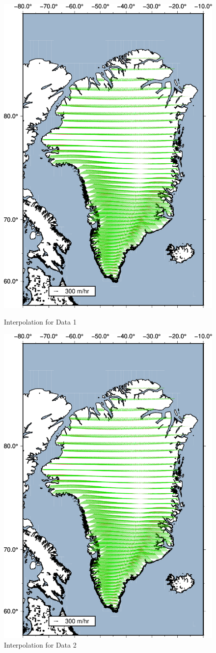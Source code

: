 \documentclass{article}
\begin{document}
\begin{figure}[!htb]
   \begin{minipage}{0.48\textwidth}
     \centering
     \includegraphics[width=.7\linewidth]{Ridge_pred_REAL.pdf}
     \caption{Interpolation for Data 1}\label{Fig:Data1}
   \end{minipage}\hfill
   \begin{minipage}{0.48\textwidth}
     \centering
     \includegraphics[width=.7\linewidth]{LASSO_inversion_REAL.pdf}
     \caption{Interpolation for Data 2}\label{Fig:Data2}
   \end{minipage}
\end{figure}
\end{document}
